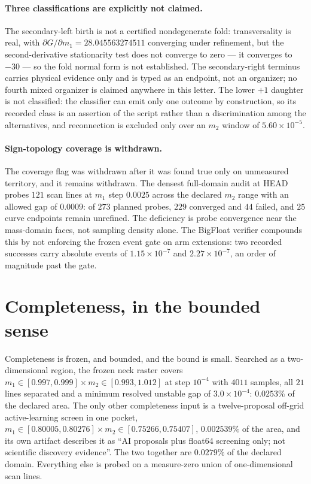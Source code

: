 \documentclass[11pt]{article}
\begin{document}
\paragraph{Three classifications are explicitly not claimed.} The secondary-left birth is not a
certified nondegenerate fold: transversality is real, with $\partial G/\partial m_1 =
28.045563274511$ converging under refinement, but the second-derivative stationarity test does not
converge to zero --- it converges to $-30$ --- so the fold normal form is not established. The
secondary-right terminus carries physical evidence only and is typed as an endpoint, not an
organizer; no fourth mixed organizer is claimed anywhere in this letter. The lower $+1$ daughter is
not classified: the classifier can emit only one outcome by construction, so its recorded class is
an assertion of the script rather than a discrimination among the alternatives, and reconnection is
excluded only over an $m_2$ window of $5.60\times10^{-5}$.

\paragraph{Sign-topology coverage is withdrawn.} The coverage flag was withdrawn after it was found
true only on unmeasured territory, and it remains withdrawn. The densest full-domain audit at HEAD
probes $121$ scan lines at $m_1$ step $0.0025$ across the declared $m_2$ range with an allowed gap of
$0.0009$: of $273$ planned probes, $229$ converged and $44$ failed, and $25$ curve endpoints remain
unrefined. The deficiency is probe convergence near the mass-domain faces, not sampling density
alone. The BigFloat verifier compounds this by not enforcing the frozen event gate on arm
extensions: two recorded successes carry absolute events of $1.15\times10^{-7}$ and
$2.27\times10^{-7}$, an order of magnitude past the gate.

\section{Completeness, in the bounded sense}

Completeness is frozen, and bounded, and the bound is small. Searched as a two-dimensional region,
the frozen neck raster covers $m_1\in[0.997,0.999]\times m_2\in[0.993,1.012]$ at step $10^{-4}$ with
$4011$ samples, all $21$ lines separated and a minimum resolved unstable gap of $3.0\times10^{-4}$:
$0.0253\%$ of the declared area. The only other completeness input is a twelve-proposal off-grid
active-learning screen in one pocket, $m_1\in[0.80005,0.80276]\times m_2\in[0.75266,0.75407]$,
$0.002539\%$ of the area, and its own artifact describes it as ``AI proposals plus float64 screening
only; not scientific discovery evidence''. The two together are $0.0279\%$ of the declared domain.
Everything else is probed on a measure-zero union of one-dimensional scan lines.
\end{document}
